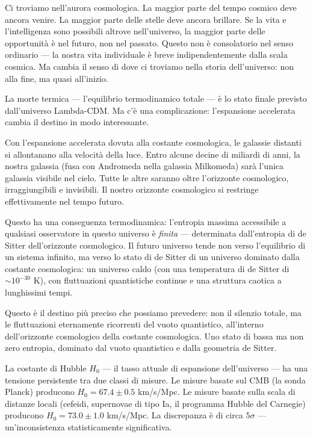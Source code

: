 \documentclass[12pt,a4paper,openany]{book}
\newcommand{\sezione}[1]{\vspace{1.2em}{\large\bfseries #1}\vspace{0.5em}\par}
\begin{document}
Ci troviamo nell'aurora cosmologica. La maggior parte del tempo cosmico deve ancora venire. La maggior parte delle stelle deve ancora brillare. Se la vita e l'intelligenza sono possibili altrove nell'universo, la maggior parte delle opportunità è nel futuro, non nel passato. Questo non è consolatorio nel senso ordinario --- la nostra vita individuale è breve indipendentemente dalla scala cosmica. Ma cambia il senso di dove ci troviamo nella storia dell'universo: non alla fine, ma quasi all'inizio.

\sezione{Il problema dell'entropia finale e la termodinamica cosmologica}

La morte termica --- l'equilibrio termodinamico totale --- è lo stato finale previsto dall'universo Lambda-CDM. Ma c'è una complicazione: l'espansione accelerata cambia il destino in modo interessante.

Con l'espansione accelerata dovuta alla costante cosmologica, le galassie distanti si allontanano alla velocità della luce. Entro alcune decine di miliardi di anni, la nostra galassia (fusa con Andromeda nella galassia Milkomeda) sarà l'unica galassia visibile nel cielo. Tutte le altre saranno oltre l'orizzonte cosmologico, irraggiungibili e invisibili. Il nostro orizzonte cosmologico si restringe effettivamente nel tempo futuro.

Questo ha una conseguenza termodinamica: l'entropia massima accessibile a qualsiasi osservatore in questo universo è \textit{finita} --- determinata dall'entropia di de Sitter dell'orizzonte cosmologico. Il futuro universo tende non verso l'equilibrio di un sistema infinito, ma verso lo stato di de Sitter di un universo dominato dalla costante cosmologica: un universo caldo (con una temperatura di de Sitter di $\sim 10^{-30}$ K), con fluttuazioni quantistiche continue e una struttura caotica a lunghissimi tempi.

Questo è il destino più preciso che possiamo prevedere: non il silenzio totale, ma le fluttuazioni eternamente ricorrenti del vuoto quantistico, all'interno dell'orizzonte cosmologico della costante cosmologica. Uno stato di bassa ma non zero entropia, dominato dal vuoto quantistico e dalla geometria de Sitter.

\sezione{La Hubble tension: un segnale di nuova fisica?}

La costante di Hubble $H_0$ --- il tasso attuale di espansione dell'universo --- ha una tensione persistente tra due classi di misure. Le misure basate sul CMB (la sonda Planck) producono $H_0 = 67.4 \pm 0.5$ km/s/Mpc. Le misure basate sulla scala di distanze locali (cefeidi, supernovae di tipo Ia, il programma Hubble del Carnegie) producono $H_0 = 73.0 \pm 1.0$ km/s/Mpc. La discrepanza è di circa $5\sigma$ --- un'inconsistenza statisticamente significativa.
\end{document}
